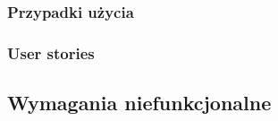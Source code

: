 \documentclass[10pt,a4paper]{article}
\begin{document}
\subsubsection*{Przypadki użycia}
\subsubsection*{User stories}

\subsection{Wymagania niefunkcjonalne}
%
\end{document}
